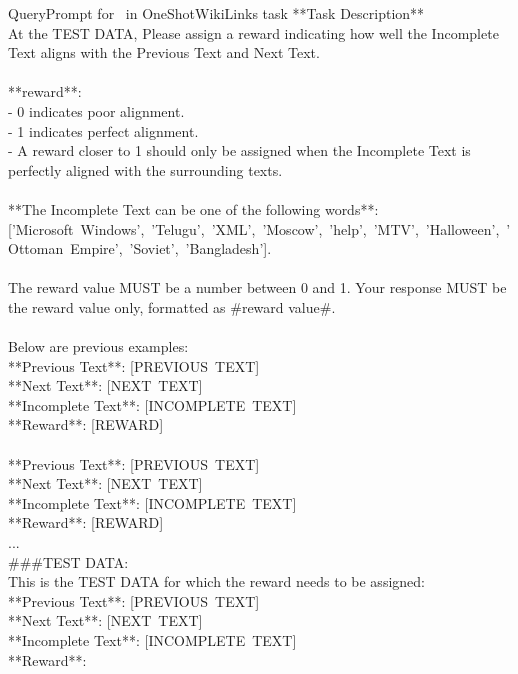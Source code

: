 \begin{mycolorbox}{Query}{Prompt for \algts~in OneShotWikiLinks task}
\small
**Task Description**\\
At the TEST DATA, Please assign a reward indicating how well the Incomplete Text aligns with the Previous Text and Next Text.\\\\
**reward**:\\
- 0 indicates poor alignment.\\
- 1 indicates perfect alignment.\\
- A reward closer to 1 should only be assigned when the Incomplete Text is perfectly aligned with the surrounding texts.\\\\
**The Incomplete Text can be one of the following words**:\\
\mbox{['Microsoft Windows', 'Telugu', 'XML', 'Moscow', 'help', 'MTV', 'Halloween', 'Ottoman Empire', 'Soviet', 'Bangladesh'].}\\\\
The reward value MUST be a number between 0 and 1. Your response MUST be the reward value only, formatted as \#reward value\#.\\\\
Below are previous examples:\\
**Previous Text**: \mbox{[PREVIOUS TEXT]}\\
**Next Text**: \mbox{[NEXT TEXT]}\\
**Incomplete Text**: \mbox{[INCOMPLETE TEXT]}\\
**Reward**: \mbox{[REWARD]}\\\\
**Previous Text**: \mbox{[PREVIOUS TEXT]}\\
**Next Text**: \mbox{[NEXT TEXT]}\\
**Incomplete Text**: \mbox{[INCOMPLETE TEXT]}\\
**Reward**: \mbox{[REWARD]}\\

...\\

\#\#\#TEST DATA:\\
This is the TEST DATA for which the reward needs to be assigned:\\
**Previous Text**: \mbox{[PREVIOUS TEXT]}\\
**Next Text**: \mbox{[NEXT TEXT]}\\
**Incomplete Text**: \mbox{[INCOMPLETE TEXT]}\\
**Reward**:
\end{mycolorbox}





